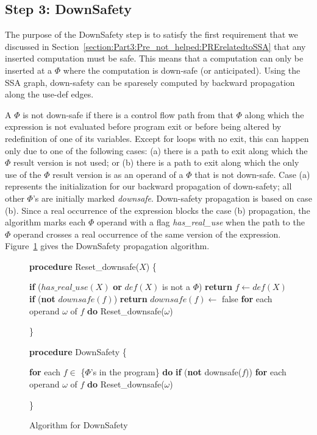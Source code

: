 \subsection{Step 3: DownSafety}

The purpose of the DownSafety step is to satisfy the first requirement
that we discussed in 
Section~\ref{section:Part3:Pre_not_helped:PRErelatedtoSSA}
that any inserted computation must be safe.  This means that a computation
can only be inserted at a $\Phi$ where the computation is down-safe (or
anticipated).  Using the SSA graph, down-safety can be sparesely computed
by backward propagation along the use-def edges.

A $\Phi$ is not down-safe if there is a control flow path from that $\Phi$
along which the expression is not evaluated before program exit or before 
being altered by redefinition of one of its variables.  Except for loops with
no exit, this can happen only due to one of the following cases: (a) there
is a path to exit along which the $\Phi$ result version is not used; or (b)
there is a path to exit along which the only use of the $\Phi$ result
version is as an operand of a $\Phi$ that is not down-safe.  Case (a)
represents the initialization for our backward propagation of down-safety;
all other $\Phi$'s are initially marked \emph{downsafe}.  Down-safety
propagation is based on case (b).  Since a real occurrence of the
expression blocks the case (b) propagation, the algorithm marks each
$\Phi$ operand with a flag \emph{has\_real\_use} when the path to the $\Phi$
operand crosses a real occurrence of the same version of the expression.
Figure~\ref{fig: downsafety} gives the DownSafety propagation algorithm.

\begin{figure}[!ht]
{\bf procedure} Reset\_downsafe($X$) 
\{
\begin{code}
 {\bf if} ($has\_real\_use(X)$ {\bf or} $def(X)$ is not a $\Phi$)
   {\bf return}
 $f \leftarrow def(X)$
 {\bf if} ({\bf not} $downsafe(f)$)
   {\bf return}
 $downsafe(f) \leftarrow$ false
 {\bf for} each operand $\omega$ of $f$ {\bf do}
   Reset\_downsafe($\omega$)
\end{code}
\}

{\bf procedure} DownSafety
\{
\begin{code}
 {\bf for} each $f \in$ \{$\Phi$'s in the program\} {\bf do}
   {\bf if} ({\bf not} downsafe($f$))
     {\bf for} each operand $\omega$ of $f$ {\bf do}
	  Reset\_downsafe($\omega$)
\end{code}
\}
\caption{Algorithm for DownSafety}
\label{fig: downsafety}
\end{figure}

